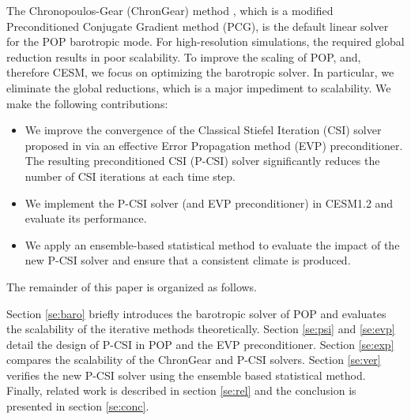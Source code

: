 The Chronopoulos-Gear (ChronGear) method \cite{dAzevedo1999lapack},
which is a modified Preconditioned Conjugate Gradient method (PCG),  is
the default linear solver for the POP barotropic mode.  For
high-resolution simulations, the required global reduction results in
poor scalability. To improve the scaling of POP, and, therefore CESM, 
we focus on optimizing the barotropic solver.  In particular, we
eliminate the global reductions, which is a major impediment to 
scalability.  We make the following contributions:





\begin{itemize}
\item We improve the convergence of the Classical Stiefel Iteration
  (CSI) solver proposed in \cite{hu2013scalable} via an effective
  Error Propagation method (EVP) \cite{roache1995elliptic}
  preconditioner. The resulting preconditioned CSI (P-CSI) solver
  significantly reduces the number of CSI iterations at each time
  step.
\item
We implement the P-CSI solver (and EVP preconditioner)  in CESM1.2 and evaluate its performance.
\item
We apply an ensemble-based statistical method to evaluate the impact
of the new P-CSI solver and ensure that a consistent climate is produced.
\end{itemize}


 The remainder of this paper is organized as follows.

 Section \ref{se:baro} briefly introduces the barotropic solver of POP
 and evaluates the scalability of the iterative methods
 theoretically. %
 Section \ref{se:psi} and \ref{se:evp} detail the design of P-CSI in
 POP and the EVP preconditioner.  Section \ref{se:exp} compares the
 scalability of the ChronGear and P-CSI solvers.  Section \ref{se:ver}
 verifies the new P-CSI solver using the ensemble based statistical
 method.  Finally, related work is described in section \ref{se:rel}
 and the conclusion is presented in section \ref{se:conc}.


